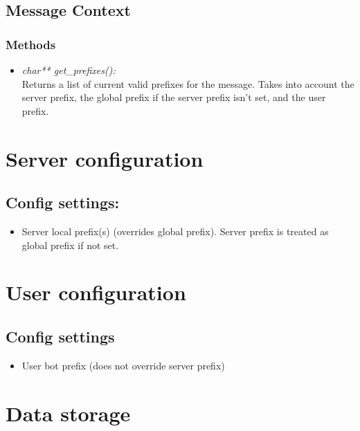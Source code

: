 \documentclass[a4paper]{amsart}
\begin{document}
\subsection{Message Context}
\subsubsection{Methods}
    \begin{itemize}
        \item \textit{char** get\_prefixes():}\\
            Returns a list of current valid prefixes for the message. Takes into account the server prefix, the global prefix if the server prefix isn't set, and the user prefix.
    \end{itemize}

\section{Server configuration}
\subsection{Config settings:}
\begin{itemize}
    \item Server local prefix(s) (overrides global prefix). Server prefix is treated as global prefix if not set.
\end{itemize}

\section{User configuration}
\subsection{Config settings}
\begin{itemize}
    \item User bot prefix (does not override server prefix)
\end{itemize}

\section{Data storage}
\end{document}
